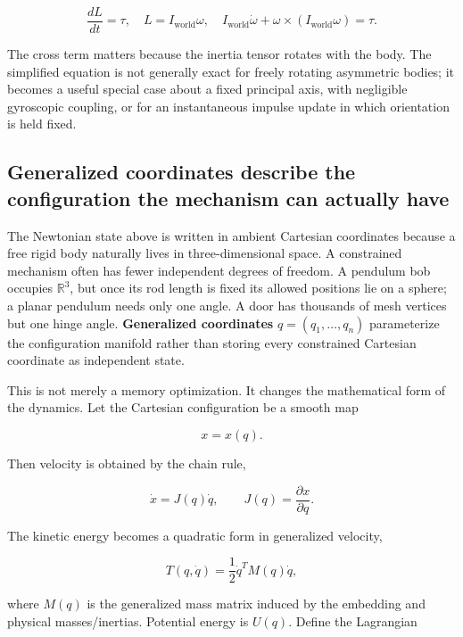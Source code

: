 \[
\frac{dL}{dt}=\tau,\quad L=I_{\mathrm{world}}\omega,\quad
I_{\mathrm{world}}\dot\omega+\omega\times(I_{\mathrm{world}}\omega)=\tau .
\]

The cross term matters because the inertia tensor rotates with the body. The simplified equation  is not generally exact for freely rotating asymmetric bodies; it becomes a useful special case about a fixed principal axis, with negligible gyroscopic coupling, or for an instantaneous impulse update in which orientation is held fixed.

\subsection{Generalized coordinates describe the configuration the mechanism can actually have}\label{02-foundations-ii-ch039-generalized-coordinates-describe-the-configuration-the-mechanism-can-actually-have}

\hypertarget{02-foundations-ii-ch039-generalized-coordinates-describe-the-configuration-the-mechanism-can-actually-have}{}

The Newtonian state above is written in ambient Cartesian coordinates because a free rigid body naturally lives in three-dimensional space. A constrained mechanism often has fewer independent degrees of freedom. A pendulum bob occupies \(\mathbb R^3\), but once its rod length is fixed its allowed positions lie on a sphere; a planar pendulum needs only one angle. A door has thousands of mesh vertices but one hinge angle. \textbf{Generalized coordinates} \(q=(q_1,\ldots,q_n)\) parameterize the configuration manifold rather than storing every constrained Cartesian coordinate as independent state.

This is not merely a memory optimization. It changes the mathematical form of the dynamics. Let the Cartesian configuration be a smooth map

\[
x=x(q).
\]

Then velocity is obtained by the chain rule,

\[
\dot x
=
J(q)\dot q,
\qquad
J(q)=\frac{\partial x}{\partial q}.
\]

The kinetic energy becomes a quadratic form in generalized velocity,

\[
T(q,\dot q)
=
\frac12
\dot q^T M(q)\dot q,
\]

where \(M(q)\) is the generalized mass matrix induced by the embedding and physical masses/inertias. Potential energy is \(U(q)\). Define the Lagrangian

